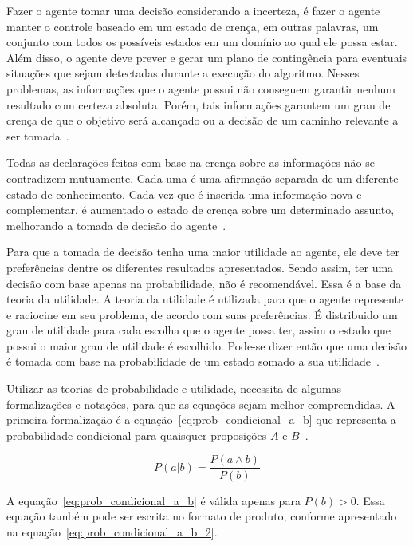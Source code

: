 Fazer o agente tomar uma decisão considerando a incerteza, é fazer o agente manter o controle baseado em um estado de crença, em outras palavras, um conjunto com todos os possíveis estados em um domínio ao qual ele possa estar. Além disso, o agente deve prever e gerar um plano de contingência para eventuais situações que sejam detectadas durante a execução do algoritmo. Nesses problemas, as informações que o agente possui não conseguem garantir nenhum resultado com certeza absoluta. Porém, tais informações garantem um grau de crença de que o objetivo será alcançado ou a decisão de um caminho relevante a ser tomada~\cite{russell:2002, faceli:2011}.

Todas as declarações feitas com base na crença sobre as informações não se contradizem mutuamente. Cada uma é uma afirmação separada de um diferente estado de conhecimento. Cada vez que é inserida uma informação nova e complementar, é aumentado o estado de crença sobre um determinado assunto, melhorando a tomada de decisão do agente~\cite{faceli:2011}.

Para que a tomada de decisão tenha uma maior utilidade ao agente, ele deve ter preferências dentre os diferentes resultados apresentados. Sendo assim, ter uma decisão com base apenas na probabilidade, não é recomendável. Essa é a base da teoria da utilidade. A teoria da utilidade é utilizada para que o agente represente e raciocine em seu problema, de acordo com suas preferências. É distribuido um grau de utilidade para cada escolha que o agente possa ter, assim o estado que possui o maior grau de utilidade é escolhido. Pode-se dizer então que uma decisão é tomada com base na probabilidade de um estado somado a sua utilidade~\cite{russell:2002}.

Utilizar as teorias de probabilidade e utilidade, necessita de algumas formalizações e notações, para que as equações sejam melhor compreendidas. A primeira formalização é a equação~\ref{eq:prob_condicional_a_b} que representa a probabilidade condicional para quaisquer proposições $A$ e $B$~\cite{russell:2002}.

\begin{equation}
    \label{eq:prob_condicional_a_b}
    P(a|b) = \frac{P(a \land b)}{P(b)}
\end{equation}

A equação~\ref{eq:prob_condicional_a_b} é válida apenas para $P(b) > 0$. Essa equação também pode ser escrita no formato de produto, conforme apresentado na equação~\ref{eq:prob_condicional_a_b_2}.


